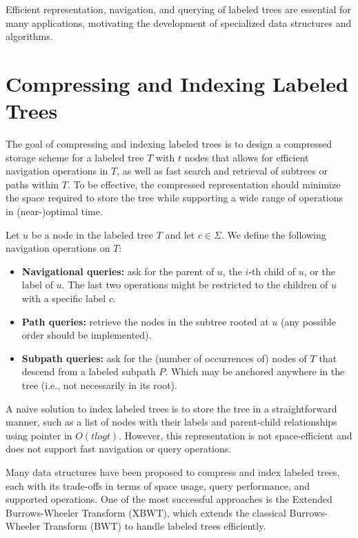Efficient representation, navigation, and querying of labeled trees are essential for many applications, motivating the development of specialized data structures and algorithms.

\section{Compressing and Indexing Labeled Trees} \label{compandindexinglabtree}
The goal of compressing and indexing labeled trees is to design a compressed storage scheme for a labeled tree $T$ with $t$ nodes that allows for efficient navigation operations in $T$, as well as fast search and retrieval of subtrees or paths within $T$. To be effective, the compressed representation should minimize the space required to store the tree while supporting a wide range of operations in (near-)optimal time.

Let $u$ be a node in the labeled tree $T$ and let $c \in \Sigma$. We define the following navigation operations on $T$:
\begin{itemize}
    \item \textbf{Navigational queries:} ask for the parent of $u$, the $i$-th child of $u$, or the label of $u$. The last two operations might be restricted to the children of $u$ with a specific label $c$.
    \item \textbf{Path queries:} retrieve the nodes in the subtree rooted at $u$ (any possible order should be implemented).
    \item \textbf{Subpath queries:} ask for the (number of occurrences of) nodes of $T$ that descend from a labeled subpath $P$. Which may be anchored anywhere in the tree (i.e., not necessarily in its root). 
\end{itemize}

A naive solution to index labeled trees is to store the tree in a straightforward manner, such as a list of nodes with their labels and parent-child relationships using pointer in $O(t log t)$. However, this representation is not space-efficient and does not support fast navigation or query operations. 

Many data structures have been proposed to compress and index labeled trees, each with its trade-offs in terms of space usage, query performance, and supported operations. One of the most successful approaches is the Extended Burrows-Wheeler Transform (XBWT), which extends the classical Burrows-Wheeler Transform (BWT) to handle labeled trees efficiently. 

